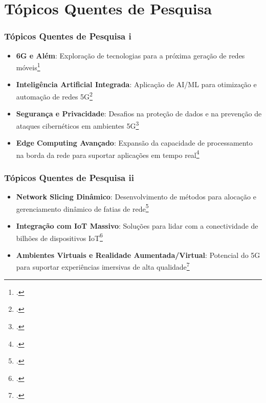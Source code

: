 
\section{Tópicos Quentes de Pesquisa}
\begin{frame}
    \frametitle{Tópicos Quentes de Pesquisa i}
    \begin{itemize}
        \item \textbf{6G e Além}: Exploração de tecnologias para a próxima geração de redes móveis\footcite{6G_beyond}
        \item \textbf{Inteligência Artificial Integrada}: Aplicação de AI/ML para otimização e automação de redes 5G\footcite{AI_5G}
        \item \textbf{Segurança e Privacidade}: Desafios na proteção de dados e na prevenção de ataques cibernéticos em ambientes 5G\footcite{Security_5G}
        \item \textbf{Edge Computing Avançado}: Expansão da capacidade de processamento na borda da rede para suportar aplicações em tempo real\footcite{MEC_5G}
    \end{itemize}
\end{frame}

\begin{frame}
    \frametitle{Tópicos Quentes de Pesquisa ii}
    \begin{itemize}
        \item \textbf{Network Slicing Dinâmico}: Desenvolvimento de métodos para alocação e gerenciamento dinâmico de fatias de rede\footcite{Dynamic_NS}
        \item \textbf{Integração com IoT Massivo}: Soluções para lidar com a conectividade de bilhões de dispositivos IoT\footcite{Massive_IoT}
        \item \textbf{Ambientes Virtuais e Realidade Aumentada/Virtual}: Potencial do 5G para suportar experiências imersivas de alta qualidade\footcite{ARVR_5G}
    \end{itemize}
\end{frame}